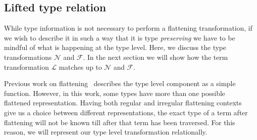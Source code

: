 







\subsection{Lifted type relation}

While type information is not necessary to perform a flattening transformation, if we wish to describe it in such a way that it is type \emph{preserving} we have to be mindful of what is happening at the type level. Here, we discuss the type transformations $\mathcal{N}$ and $\mathcal{F}$. In the next section we will show how the term transformation $\mathcal{L}$ matches up to $\mathcal{N}$ and $\mathcal{F}$.

Previous work on flattening~\cite{Chakravarty:more-types} describes the type level component as a simple function. However, in this work, some types have more than one possible flattened representation. Having both regular and irregular flattening contexts give us a choice between different representations, the exact type of a term after flattening will not be known till after that term has been traversed. For this reason, we will represent our type level transformation relationally.

